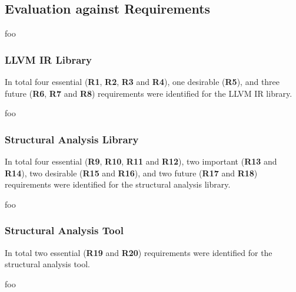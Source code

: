 
\subsection{Evaluation against Requirements}

foo

\subsubsection{LLVM IR Library}

In total four essential (\textbf{R1}, \textbf{R2}, \textbf{R3} and \textbf{R4}), one desirable (\textbf{R5}), and three future (\textbf{R6}, \textbf{R7} and \textbf{R8}) requirements were identified for the LLVM IR library.

foo

\subsubsection{Structural Analysis Library}

In total four essential (\textbf{R9}, \textbf{R10}, \textbf{R11} and \textbf{R12}), two important (\textbf{R13} and \textbf{R14}), two desirable (\textbf{R15} and \textbf{R16}), and two future (\textbf{R17} and \textbf{R18}) requirements were identified for the structural analysis library.

foo

\subsubsection{Structural Analysis Tool}

In total two essential (\textbf{R19} and \textbf{R20}) requirements were identified for the structural analysis tool.

foo
